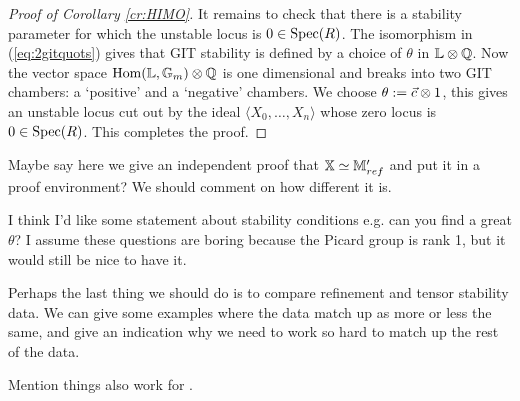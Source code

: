 \documentclass[12pt]{amsart}
\begin{document}
\begin{proof}[Proof of Corollary \ref{cr:HIMO}]
It remains to check that there is a stability parameter for which the unstable locus is $0 \in \operatorname{Spec}(R)$. 
The isomorphism in (\ref{eq:2gitquots}) gives that GIT stability is defined by a choice of $\theta$ in $\mathbb{L} \otimes \mathbb{Q}$. 
Now the vector space $\operatorname{Hom}(\mathbb{L}, \mathbb{G}_m) \otimes \mathbb{Q}$ is one dimensional and breaks into two GIT chambers: a `positive' and a `negative' chambers. 
We choose $\theta:= {\vec{c}} \otimes 1$, this gives an unstable locus cut out by the ideal $\langle X_0, \ldots, X_n\rangle$ whose zero locus is $0 \in \operatorname{Spec}(R)$.
This completes the proof.
\end{proof}

{\red Maybe say here we give an independent proof that $\mathbb{X} \simeq \mathbb{M}'_{ref}$ and put it in a proof environment? We should comment on how different it is.}

{\red I think I'd like some statement about stability conditions e.g. can you find a great $\theta$? I assume these questions are boring because the Picard group is rank 1, but it would still be nice to have it.}

{\red Perhaps the last thing we should do is to compare refinement and tensor stability data. We can give some examples where the data match up as more or less the same, and give an indication why we need to work so hard to match up the rest of the data.}

{\red Mention things also work for \cite{C17}.}



\end{document}
